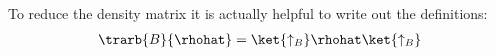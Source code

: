 To reduce the density matrix it is actually helpful to write out the definitions:
\begin{align}
\trarb{B}{\rhohat} = \ket{\uparrow_B}\rhohat\ket{\uparrow_B}
\end{align}